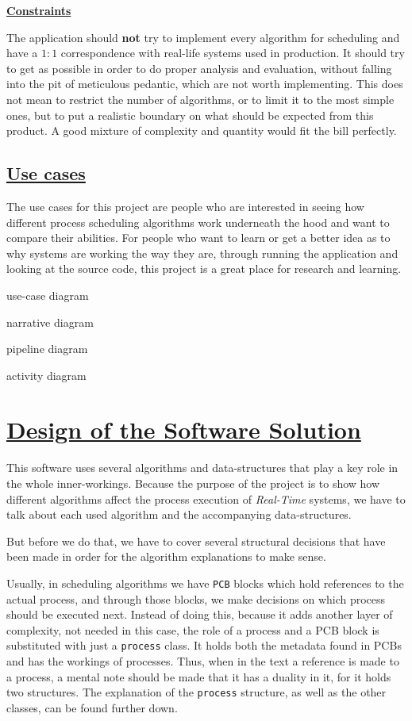 \documentclass{article}
\newcommand{\code}[1]{\colorbox{codebg}{{\color{black}\texttt{#1}}}}
\begin{document}
\underline{\textbf{Constraints}}

The application should \textbf{not} try to implement every algorithm for scheduling and have a \(1:1\) correspondence with real-life systems used in production. It should try to get as possible in order to do proper analysis and evaluation, without falling into the pit of meticulous pedantic, which are not worth implementing. This does not mean to restrict the number of algorithms, or to limit it to the most simple ones, but to put a realistic boundary on what should be expected from this product. A good mixture of complexity and quantity would fit the bill perfectly.

\subsection{\underline{Use cases}}

The use cases for this project are people who are interested in seeing how different process scheduling algorithms work underneath the hood and want to compare their abilities. For people who want to learn or get a better idea as to why systems are working the way they are, through running the application and looking at the source code, this project is a great place for research and learning.

use-case diagram

narrative diagram

pipeline diagram

activity diagram

\section{\underline{Design of the Software Solution}}

This software uses several algorithms and data-structures that play a key role in the whole inner-workings. Because the purpose of the project is to show how different algorithms affect the process execution of \textit{Real-Time} systems, we have to talk about each used algorithm and the accompanying data-structures.

But before we do that, we have to cover several structural decisions that have been made in order for the algorithm explanations to make sense.

Usually, in scheduling algorithms we have \code{PCB} blocks which hold references to the actual process, and through those blocks, we make decisions on which process should be executed next. Instead of doing this, because it adds another layer of complexity, not needed in this case, the role of a process and a PCB block is substituted with just a \code{process} class. It holds both the metadata found in PCBs and has the workings of processes. Thus, when in the text a reference is made to a process, a mental note should be made that it has a duality in it, for it holds two structures. The explanation of the \code{process} structure, as well as the other classes, can be found further down.
\end{document}
